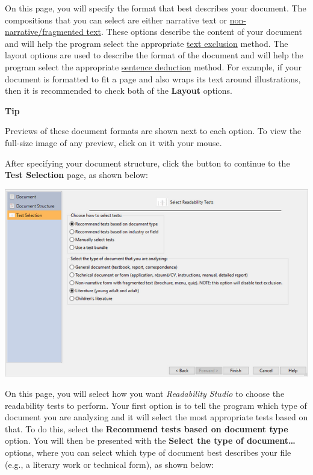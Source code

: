 \documentclass[
]{book}
\newenvironment{tipsection}
    {
    \begin{tcolorbox}[colframe=lightgray,colback=lightyellow,arc=3mm]
    \faLightbulb[regular] \textbf{Tip} \newline
    }
    {
    \end{tcolorbox}
    }
\theoremstyle{definition}
\theoremstyle{definition}
\theoremstyle{definition}
\theoremstyle{definition}
\theoremstyle{remark}
\begin{document}
On this page, you will specify the format that best describes your document. The compositions that you can select are either narrative text or \protect\hyperlink{framented-text}{non-narrative/fragmented text}. These options describe the content of your document and will help the program select the appropriate \protect\hyperlink{options-text-exclusion}{text exclusion} method. The layout options are used to describe the format of the document and will help the program select the appropriate \protect\hyperlink{options-sentence-deduction}{sentence deduction} method. For example, if your document is formatted to fit a page and also wraps its text around illustrations, then it is recommended to check both of the \textbf{Layout} options.

\begin{tipsection}
Previews of these document formats are shown next to each option. To view the full-size image of any preview, click on it with your mouse.

\end{tipsection}

After specifying your document structure, click the  button to continue to the \textbf{Test Selection} page, as shown below:

\includegraphics{Images/wizardreadabilitymethods.png}

On this page, you will select how you want \emph{Readability Studio} to choose the readability tests to perform. Your first option is to tell the program which type of document you are analyzing and it will select the most appropriate tests based on that. To do this, select the \textbf{Recommend tests based on document type} option. You will then be presented with the \textbf{Select the type of document\ldots{}} options, where you can select which type of document best describes your file (e.g., a literary work or technical form), as shown below:
\end{document}
